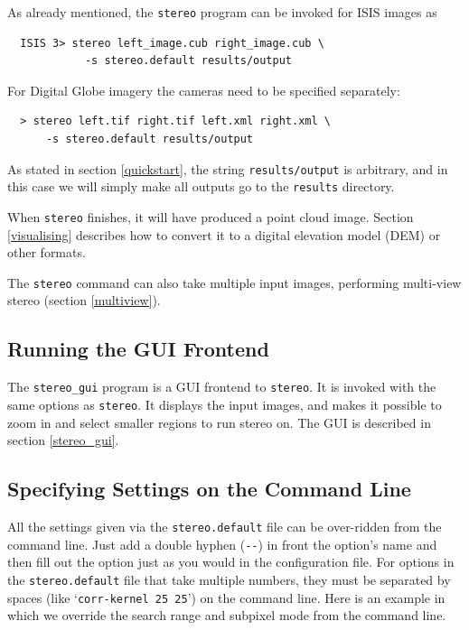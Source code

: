As already mentioned, the \texttt{stereo} program can be invoked for ISIS
images as

\begin{verbatim}
  ISIS 3> stereo left_image.cub right_image.cub \
            -s stereo.default results/output
\end{verbatim}

For Digital Globe imagery the cameras need to be specified separately:


\begin{verbatim}
  > stereo left.tif right.tif left.xml right.xml \
      -s stereo.default results/output
\end{verbatim}

As stated in section \ref{quickstart}, the string
\texttt{results/output} is arbitrary, and in this case we will
simply make all outputs go to the \texttt{results} directory.

When \texttt{stereo} finishes, it will have produced a point cloud
image. Section \ref{visualising} describes how to convert it to a
digital elevation model (DEM) or other formats.

The \texttt{stereo} command can also take multiple input images, performing
multi-view stereo (section \ref{multiview}).

\subsection{Running the GUI Frontend}
The \texttt{stereo\_gui} program is a GUI frontend to \texttt{stereo}.
It is invoked with the same options as \texttt{stereo}. It displays
the input images, and makes it possible to zoom in and select smaller
regions to run stereo on. The GUI is described in section \ref{stereo_gui}.

\subsection{Specifying Settings on the Command Line}
\label{cmdline}

All the settings given via the \texttt{stereo.default} file can be
over-ridden from the command line. Just add a double hyphen
(\texttt{-\/-}) in front the option's name and then fill out the option
just as you would in the configuration file. For options in the
\texttt{stereo.default} file that take multiple numbers, they must be
separated by spaces (like `\texttt{corr-kernel~25~25}') on the command
line. Here is an example in which we override the search range and
subpixel mode from the command line.

